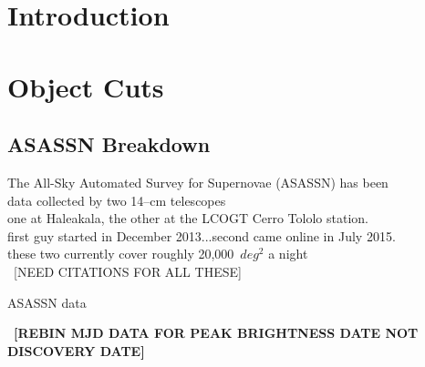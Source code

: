 \documentclass[aps,prb,twocolumn,superscriptaddress]{revtex4-1}
\begin{document}
\clearpage


\section{Introduction}


\section{Object Cuts}


\subsection{ASASSN Breakdown}
The All-Sky Automated Survey for Supernovae (ASASSN) has been\\
data collected by two 14--cm telescopes\\
one at Haleakala, the other at the LCOGT Cerro Tololo station.\\
first guy started in December 2013...second came online in July 2015.\\
these two currently cover roughly 20,000~$deg^{2}$ a night\\
~[NEED CITATIONS FOR ALL THESE]

ASASSN data~\cite{asn_data}

~{\bf [REBIN MJD DATA FOR PEAK BRIGHTNESS DATE NOT DISCOVERY DATE]}
\end{document}
